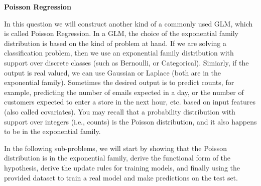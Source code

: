 \item {} {\bf Poisson Regression}

In this question we will construct another kind of a commonly used GLM, which is called Poisson Regression. In a GLM, the choice of the exponential family distribution is based on the kind of problem at hand. If we are solving a classification problem, then we use an exponential family distribution with support over discrete classes (such as Bernoulli, or Categorical). Simiarly, if the output is real valued, we can use Gaussian or Laplace (both are in the exponential family). Sometimes the desired output is to predict counts, for example, predicting the number of emails expected in a day, or the number of customers expected to enter a store in the next hour, etc. based on input features (also called covariates). You may recall that a probability distribution with support over integers (i.e., counts) is the Poisson distribution, and it also happens to be in the exponential family.

In the following sub-problems, we will start by showing that the Poisson distribution is in the exponential family, derive the functional form of the hypothesis, derive the update rules for training models, and finally using the provided dataset to train a real model and make predictions on the test set.

\begin{enumerate}
	

\ifnum{}\fi

	


\ifnum{}\fi

	


\ifnum{}\fi

	


\ifnum{} {
  
} \fi

\end{enumerate}
